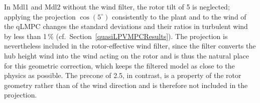 In Mdl1 and Mdl2 without the wind filter, the rotor tilt of 5\textdegree{} is neglected; applying the projection $\cos(5^\circ)$ consistently to the plant and to the wind of the qLMPC changes the standard deviations and their ratios in turbulent wind by less than 1\,\% (cf.\ Section~\ref{quasiLPVMPCResults}). The projection is nevertheless included in the rotor-effective wind filter, since the filter converts the hub height wind into the wind acting on the rotor and is thus the natural place for this geometric correction, which keeps the filtered model as close to the physics as possible. The precone of 2.5\textdegree{}, in contrast, is a property of the rotor geometry rather than of the wind direction and is therefore not included in the projection.
